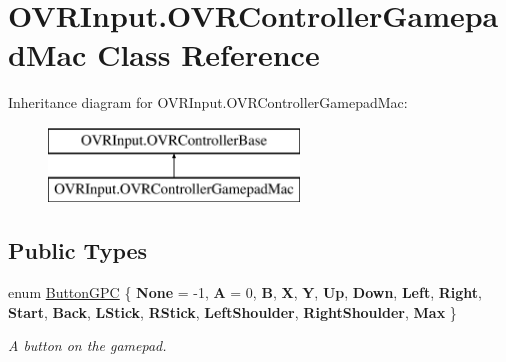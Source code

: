 \hypertarget{class_o_v_r_input_1_1_o_v_r_controller_gamepad_mac}{}\section{O\+V\+R\+Input.\+O\+V\+R\+Controller\+Gamepad\+Mac Class Reference}
\label{class_o_v_r_input_1_1_o_v_r_controller_gamepad_mac}
Inheritance diagram for O\+V\+R\+Input.\+O\+V\+R\+Controller\+Gamepad\+Mac\+:\begin{figure}[H]
\begin{center}
\leavevmode
\includegraphics[height=2.000000cm]{class_o_v_r_input_1_1_o_v_r_controller_gamepad_mac}
\end{center}
\end{figure}
\subsection*{Public Types}
\begin{DoxyCompactItemize}
\item 
enum \mbox{\hyperlink{class_o_v_r_input_1_1_o_v_r_controller_gamepad_mac_af829fe743d6bc1789f834884cdd9d9f7}{Button\+G\+PC}} \{ \newline
{\bfseries None} = -\/1, 
{\bfseries A} = 0, 
{\bfseries B}, 
{\bfseries X}, 
\newline
{\bfseries Y}, 
{\bfseries Up}, 
{\bfseries Down}, 
{\bfseries Left}, 
\newline
{\bfseries Right}, 
{\bfseries Start}, 
{\bfseries Back}, 
{\bfseries L\+Stick}, 
\newline
{\bfseries R\+Stick}, 
{\bfseries Left\+Shoulder}, 
{\bfseries Right\+Shoulder}, 
{\bfseries Max}
 \}
\begin{DoxyCompactList}\small\item\em A button on the gamepad. \end{DoxyCompactList}\end{DoxyCompactItemize}
